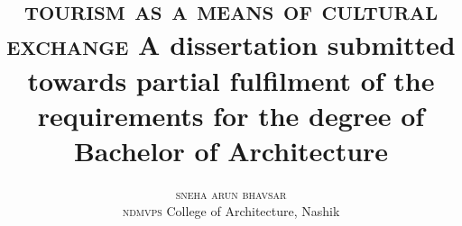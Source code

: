 \documentclass[a5paper]{book}
\title{
  \Large{\textsc{tourism as a means of cultural exchange}}
  \newline
  \newline
  \small{
  A dissertation submitted towards partial fulfilment of the\\
  requirements for the degree of Bachelor of Architecture
  }
}
\author{
  \textsc{sneha arun bhavsar}\\
  \small{
    \textsc{ndmvps} College of Architecture, Nashik
    }
  }
\date{
  \vfill
  \small{
  \centerline{\texttt{[image: img/puni]}}
  University of Pune\\
  1997--8
  \\
  }
}
\begin{document}
  \maketitle

  \pagebreak

  

  \pagebreak

  \tableofcontents
  \listoffigures
  \listoftables

  \vfill
  
  \pagebreak

    
  
  
  
  
  
  
  
  
  
\end{document}
